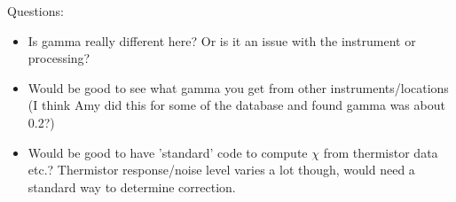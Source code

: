 \documentclass[11pt]{article}
\begin{document}
Questions:

\begin{itemize}
\item Is gamma really different here? Or is it an issue with the instrument or processing?
\item Would be good to see what gamma you get from other instruments/locations (I think Amy did this for some of the database and found gamma was about 0.2?)
\item Would be good to have 'standard' code to compute $\chi$ from thermistor data etc.? Thermistor response/noise level varies a lot though, would need a standard way to determine correction.
\end{itemize}
\end{document}
